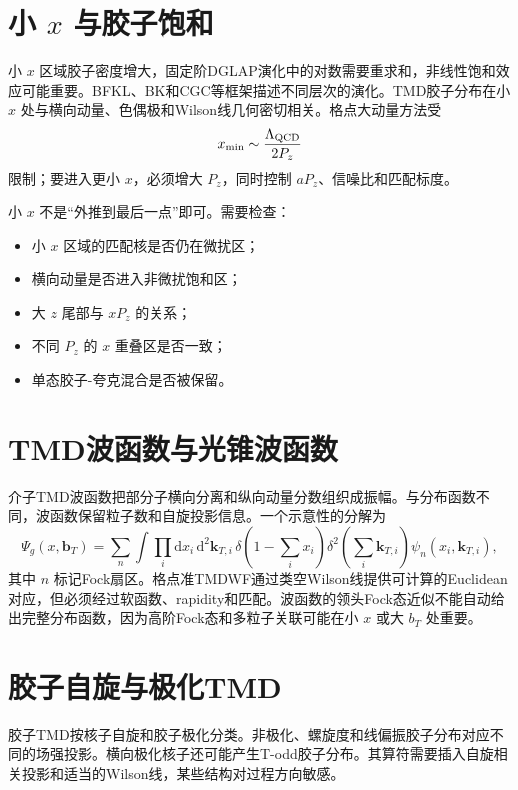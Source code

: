 \documentclass[UTF8,12pt,a4paper,twoside,openany]{ctexbook}
\newcommand{\dd}{\mathrm{d}}
\newcommand{\bT}{\boldsymbol b_T}
\begin{document}
\section{\texorpdfstring{小 \(x\) 与胶子饱和}{小 x 与胶子饱和}}

小 \(x\) 区域胶子密度增大，固定阶DGLAP演化中的对数需要重求和，非线性饱和效应可能重要。BFKL、BK和CGC等框架描述不同层次的演化。TMD胶子分布在小 \(x\) 处与横向动量、色偶极和Wilson线几何密切相关。格点大动量方法受
\begin{equation}
  x_{\min}\sim\frac{\Lambda_{\rm QCD}}{2P_z}
  \label{eq:advanced-xmin}
\end{equation}
限制；要进入更小 \(x\)，必须增大 \(P_z\)，同时控制 \(aP_z\)、信噪比和匹配标度。

小 \(x\) 不是“外推到最后一点”即可。需要检查：
\begin{itemize}
  \item 小 \(x\) 区域的匹配核是否仍在微扰区；
  \item 横向动量是否进入非微扰饱和区；
  \item 大 \(z\) 尾部与 \(xP_z\) 的关系；
  \item 不同 \(P_z\) 的 \(x\) 重叠区是否一致；
  \item 单态胶子-夸克混合是否被保留。
\end{itemize}

\section{TMD波函数与光锥波函数}

介子TMD波函数把部分子横向分离和纵向动量分数组织成振幅。与分布函数不同，波函数保留粒子数和自旋投影信息。一个示意性的分解为
\begin{equation}
  \Psi_g(x,\bT)
  =\sum_{n}\int\prod_i\dd x_i\,\dd^2\mathbf k_{T,i}\,
  \delta\left(1-\sum_ix_i\right)
  \delta^2\left(\sum_i\mathbf k_{T,i}\right)
  \psi_n(x_i,\mathbf k_{T,i}),
  \label{eq:tmd-wavefunction}
\end{equation}
其中 \(n\) 标记Fock扇区。格点准TMDWF通过类空Wilson线提供可计算的Euclidean对应，但必须经过软函数、rapidity和匹配。波函数的领头Fock态近似不能自动给出完整分布函数，因为高阶Fock态和多粒子关联可能在小 \(x\) 或大 \(b_T\) 处重要。

\section{胶子自旋与极化TMD}

胶子TMD按核子自旋和胶子极化分类。非极化、螺旋度和线偏振胶子分布对应不同的场强投影。横向极化核子还可能产生T-odd胶子分布。其算符需要插入自旋相关投影和适当的Wilson线，某些结构对过程方向敏感。
\end{document}
